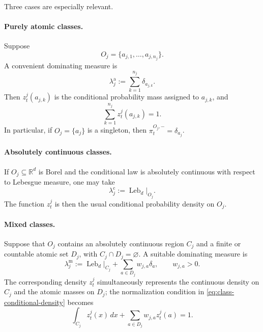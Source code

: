 \documentclass[10pt,twocolumn]{article}
\theoremstyle{remark}
\newcommand{\R}{\mathbb{R}}
\begin{document}
Three cases are especially relevant.

\paragraph{Purely atomic classes.}
Suppose
\[
O_j=\{a_{j,1},\ldots,a_{j,n_j}\}.
\]
A convenient dominating measure is
\begin{equation*}
	\lambda_j^{\mathrm a}
	:=
	\sum_{k=1}^{n_j}\delta_{a_{j,k}}.
	\label{eq:atomic-dominating-measure}
\end{equation*}
Then $z_t^j(a_{j,k})$ is the conditional probability mass assigned to $a_{j,k}$, and
\[
\sum_{k=1}^{n_j}z_t^j(a_{j,k})=1.
\]
In particular, if $O_j=\{a_j\}$ is a singleton, then $\pi_t^{O_j,-}=\delta_{a_j}$.

\paragraph{Absolutely continuous classes.}
If $O_j\subseteq\R^d$ is Borel and the conditional law is absolutely continuous with respect to Lebesgue measure, one may take
\begin{equation}
	\lambda_j^{\mathrm c}
	:=
	\operatorname{Leb}_d|_{O_j}.
	\label{eq:continuous-dominating-measure}
\end{equation}
The function $z_t^j$ is then the usual conditional probability density on $O_j$.

\paragraph{Mixed classes.}
Suppose that $O_j$ contains an absolutely continuous region $C_j$ and a finite or countable atomic set $D_j$, with $C_j\cap D_j=\varnothing$. A suitable dominating measure is
\begin{equation}
	\lambda_j^{\mathrm m}
	:=
	\operatorname{Leb}_d|_{C_j}
	+
	\sum_{a\in D_j}w_{j,a}\delta_a,
	\qquad w_{j,a}>0.
	\label{eq:mixed-dominating-measure}
\end{equation}
The corresponding density $z_t^j$ simultaneously represents the continuous density on $C_j$ and the atomic masses on $D_j$; the normalization condition in \cref{eq:class-conditional-density} becomes
\begin{equation*}
	\int_{C_j}z_t^j(x)\,dx
	+
	\sum_{a\in D_j}w_{j,a}z_t^j(a)
	=1.
	\label{eq:mixed-density-normalization}
\end{equation*}
\end{document}

